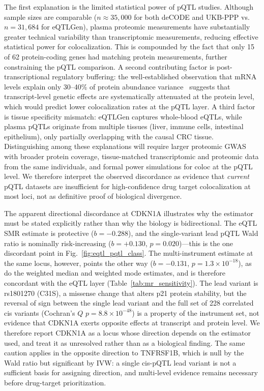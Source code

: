 \documentclass[11pt,a4paper]{article}
\begin{document}
The first explanation is the limited statistical power of pQTL
studies. Although sample sizes are comparable ($n\approx35,000$ for both
deCODE and UKB-PPP vs. $n=31,684$ for eQTLGen), plasma proteomic
measurements have substantially greater technical variability than
transcriptomic measurements, reducing effective statistical power for
colocalization. This is compounded by the fact that only 15 of 62 protein-coding
genes had matching protein measurements, further constraining the pQTL
comparison. A second contributing factor is post-transcriptional regulatory
buffering: the well-established observation that mRNA levels explain only
30--40\% of protein abundance variance~\cite{vogel2012insights} suggests that
transcript-level genetic effects are systematically attenuated at the protein
level, which would predict lower colocalization rates at the pQTL layer. A
third factor is tissue specificity mismatch: eQTLGen captures whole-blood
eQTLs, while plasma pQTLs originate from multiple tissues (liver, immune cells,
intestinal epithelium), only partially overlapping with the causal CRC tissue.
Distinguishing among these explanations will require larger proteomic GWAS
with broader protein coverage, tissue-matched transcriptomic and proteomic
data from the same individuals, and formal power simulations for coloc at the
pQTL level. We therefore interpret the observed discordance as evidence that
\textit{current} pQTL datasets are insufficient for high-confidence drug
target colocalization at most loci, not as definitive proof of
biological divergence.

The apparent directional discordance at CDKN1A illustrates why the estimator
must be stated explicitly rather than why the biology is bidirectional. The eQTL
SMR estimate is protective ($b = -0.288$), and the single-variant lead pQTL Wald
ratio is nominally risk-increasing ($b = +0.130$, $p = 0.020$)---this is the one
discordant point in Fig.~\ref{fig:eqtl_pqtl_class}. The multi-instrument estimate at the same locus,
however, points the other way ($b = -0.131$, $p = 1.3\times10^{-18}$), as do the
weighted median and weighted mode estimates, and is therefore concordant with the
eQTL layer (Table~\ref{tab:mr_sensitivity}). The lead variant is rs1801270 (C31S),
a missense change that alters p21 protein stability, but the reversal of sign
between the single lead variant and the full set of 228 correlated cis variants
(Cochran's $Q$ $p = 8.8\times10^{-48}$) is a property of the instrument set, not
evidence that CDKN1A exerts opposite effects at transcript and protein level. We
therefore report CDKN1A as a locus whose direction depends on the estimator used,
and treat it as unresolved rather than as a biological finding. The same caution
applies in the opposite direction to TNFRSF1B, which is null by the Wald ratio but
significant by IVW: a single cis-pQTL lead variant is not a sufficient basis for
assigning direction, and multi-level evidence remains necessary before
drug-target prioritization.
\end{document}
